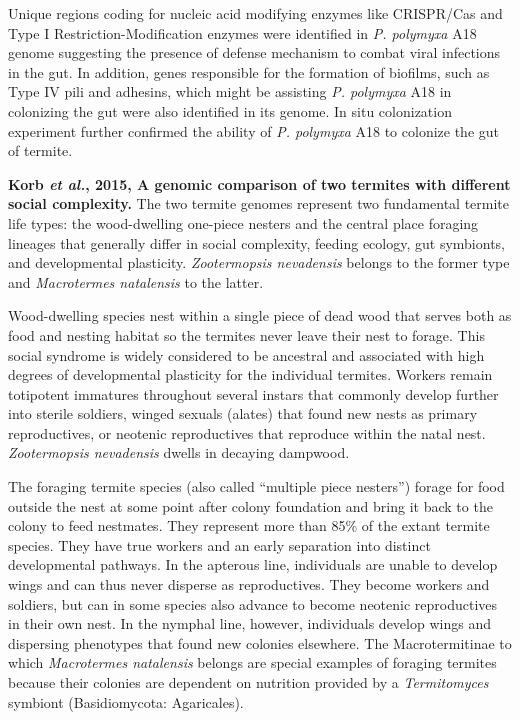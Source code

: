 \documentclass[11pt]{article}
\begin{document}
\begin{sloppypar}
Unique regions coding for nucleic acid modifying enzymes like CRISPR/Cas and Type I Restriction-Modification enzymes were identified in \textit{P. polymyxa} A18 genome suggesting the presence of defense mechanism to combat viral infections in the gut. 
In addition, genes responsible for the formation of biofilms, such as Type IV pili and adhesins, which might be assisting \textit{P. polymyxa} A18 in colonizing the gut were also identified in its genome. 
In situ colonization experiment further confirmed the ability of \textit{P. polymyxa} A18 to colonize the gut of termite. 
\par
\textbf{Korb \textit{et al.}, 2015, A genomic comparison of two termites with different social complexity.} \newline
The two termite genomes represent two fundamental termite life types: the wood-dwelling one-piece nesters and the central place foraging lineages that generally differ in social complexity, feeding ecology, gut symbionts, and developmental plasticity. 
\textit{Zootermopsis nevadensis} belongs to the former type and \textit{Macrotermes natalensis} to the latter. 
\par
Wood-dwelling species nest within a single piece of dead wood that serves both as food and nesting habitat so the termites never leave their nest to forage. 
This social syndrome is widely considered to be ancestral and associated with high degrees of developmental plasticity for the individual termites. 
Workers remain totipotent immatures throughout several instars that commonly develop further into sterile soldiers, winged sexuals (alates) that found new nests as primary reproductives, or neotenic reproductives that reproduce within the natal nest. 
\textit{Zootermopsis nevadensis} dwells in decaying dampwood. 
\par
The foraging termite species (also called “multiple piece nesters”) forage for food outside the nest at some point after colony foundation and bring it back to the colony to feed nestmates. 
They represent more than 85\% of the extant termite species. 
They have true workers and an early separation into distinct developmental pathways. 
In the apterous line, individuals are unable to develop wings and can thus never disperse as reproductives. They become workers and soldiers, but can in some species also advance to become neotenic reproductives in their own nest. 
In the nymphal line, however, individuals develop wings and dispersing phenotypes that found new colonies elsewhere. 
The Macrotermitinae to which \textit{Macrotermes natalensis} belongs are special examples of foraging termites because their colonies are dependent on nutrition provided by a \textit{Termitomyces} symbiont (Basidiomycota: Agaricales). 

\end{sloppypar}
\end{document}
